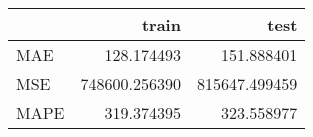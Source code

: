 \begin{tabular}{lrr}
\toprule
{} &          train &           test \\
\midrule
MAE  &     128.174493 &     151.888401 \\
MSE  &  748600.256390 &  815647.499459 \\
MAPE &     319.374395 &     323.558977 \\
\bottomrule
\end{tabular}
